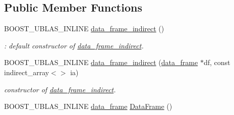 \subsection*{Public Member Functions}
\begin{DoxyCompactItemize}
\item 
B\+O\+O\+S\+T\+\_\+\+U\+B\+L\+A\+S\+\_\+\+I\+N\+L\+I\+NE \hyperlink{classboost_1_1numeric_1_1ublas_1_1data__frame__indirect_ae5608a899ae84a034623c225837df32b}{data\+\_\+frame\+\_\+indirect} ()\hypertarget{classboost_1_1numeric_1_1ublas_1_1data__frame__indirect_ae5608a899ae84a034623c225837df32b}{}\label{classboost_1_1numeric_1_1ublas_1_1data__frame__indirect_ae5608a899ae84a034623c225837df32b}

\begin{DoxyCompactList}\small\item\em \+: default constructor of \hyperlink{classboost_1_1numeric_1_1ublas_1_1data__frame__indirect}{data\+\_\+frame\+\_\+indirect}. \end{DoxyCompactList}\item 
B\+O\+O\+S\+T\+\_\+\+U\+B\+L\+A\+S\+\_\+\+I\+N\+L\+I\+NE \hyperlink{classboost_1_1numeric_1_1ublas_1_1data__frame__indirect_a5288eed2b410cc5f084069f70182da17}{data\+\_\+frame\+\_\+indirect} (\hyperlink{classboost_1_1numeric_1_1ublas_1_1data__frame}{data\+\_\+frame} $\ast$df, const indirect\+\_\+array$<$$>$ ia)
\begin{DoxyCompactList}\small\item\em constructor of \hyperlink{classboost_1_1numeric_1_1ublas_1_1data__frame__indirect}{data\+\_\+frame\+\_\+indirect}. \end{DoxyCompactList}\item 
B\+O\+O\+S\+T\+\_\+\+U\+B\+L\+A\+S\+\_\+\+I\+N\+L\+I\+NE \hyperlink{classboost_1_1numeric_1_1ublas_1_1data__frame}{data\+\_\+frame} \hyperlink{classboost_1_1numeric_1_1ublas_1_1data__frame__indirect_a0a1d19ddcd138dea692b737b51fb67c1}{Data\+Frame} ()\hypertarget{classboost_1_1numeric_1_1ublas_1_1data__frame__indirect_a0a1d19ddcd138dea692b737b51fb67c1}{}\label{classboost_1_1numeric_1_1ublas_1_1data__frame__indirect_a0a1d19ddcd138dea692b737b51fb67c1}


\end{DoxyCompactItemize}
